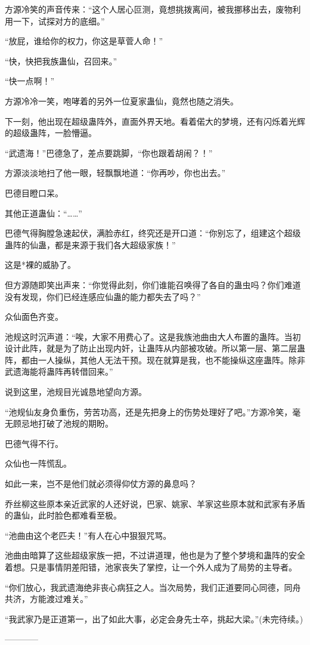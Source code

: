 \begin{this_body}
方源冷笑的声音传来：“这个人居心叵测，竟想挑拨离间，被我挪移出去，废物利用一下，试探对方的底细。”

“放屁，谁给你的权力，你这是草菅人命！”

“快，快把我族蛊仙，召回来。”

“快一点啊！”

方源冷冷一笑，咆哮着的另外一位夏家蛊仙，竟然也随之消失。

下一刻，他出现在超级蛊阵外，直面外界天地。看着偌大的梦境，还有闪烁着光辉的超级蛊阵，一脸懵逼。

“武遗海！”巴德急了，差点要跳脚，“你也跟着胡闹？！”

方源淡淡地扫了他一眼，轻飘飘地道：“你再吵，你也出去。”

巴德目瞪口呆。

其他正道蛊仙：“……”

巴德气得胸膛急速起伏，满脸赤红，终究还是开口道：“你别忘了，组建这个超级蛊阵的仙蛊，都是来源于我们各大超级家族！”

这是*裸的威胁了。

但方源随即笑出声来：“你觉得此刻，你们谁能召唤得了各自的蛊虫吗？你们难道没有发现，你们已经连感应仙蛊的能力都失去了吗？”

众仙面色齐变。

池规这时沉声道：“唉，大家不用费心了。这是我族池曲由大人布置的蛊阵。当初设计此阵，就是为了防止出现内奸，让蛊阵从内部被攻破。所以第一层、第二层蛊阵，都由一人操纵，其他人无法干预。现在就算是我，也不能操纵这座蛊阵。除非武遗海能将蛊阵再转借回来。”

说到这里，池规目光诚恳地望向方源。

“池规仙友身负重伤，劳苦功高，还是先把身上的伤势处理好了吧。”方源冷笑，毫无顾忌地打破了池规的期盼。

巴德气得不行。

众仙也一阵慌乱。

如此一来，岂不是他们就必须得仰仗方源的鼻息吗？

乔丝柳这些原本亲近武家的人还好说，巴家、姚家、羊家这些原本就和武家有矛盾的蛊仙，此时脸色都难看至极。

“池曲由这个老匹夫！”有人在心中狠狠咒骂。

池曲由暗算了这些超级家族一把，不过讲道理，他也是为了整个梦境和蛊阵的安全着想。只是事情阴差阳错，池家丧失了掌控，让一个外人成为了局势的主导者。

“你们放心，我武遗海绝非丧心病狂之人。当次局势，我们正道要同心同德，同舟共济，方能渡过难关。”

“我武家乃是正道第一，出了如此大事，必定会身先士卒，挑起大梁。”(未完待续。)

------------

\end{this_body}

